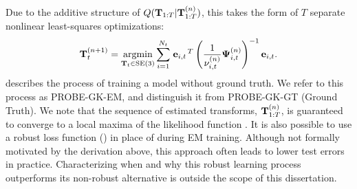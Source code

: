 Due to the additive structure of $Q(\boldsymbol{\mathbf{T}}_{1:T} \vert
\boldsymbol{\mathbf{T}}_{1:T}^{(n)})$, this takes the form of $T$ separate nonlinear least-squares optimizations:  
\begin{equation}
\label{eq:Qargmin}
  \boldsymbol{\mathbf{T}}_{t}^{(n+1)} = 
    \operatorname*{argmin}_{\boldsymbol{\mathbf{T}}_{t}\in\text{SE}(3)}
  \sum_{i=1}^{N_t} \left.{\boldsymbol{\mathbf{e}}_{i,t}}\right.^T
  \left(\frac{1}{\nu_{i,t}^{(n)}}\boldsymbol{\mathbf{\Psi}}_{i,t}^{(n)}\right)^{-1}
  \boldsymbol{\mathbf{e}}_{i,t}.
\end{equation}
  describes the process of training a model without
ground truth. We refer to this process as PROBE-GK-EM, and distinguish it from
PROBE-GK-GT (Ground Truth). We note that the sequence of estimated transforms,
$\boldsymbol{\mathbf{T}}_{1:T}^{(n)}$, is guaranteed to converge to a local maxima of the
likelihood function \citep{dempster1977maximum}. It is also possible to use a robust loss function () in place of  during EM training. Although not formally motivated by the derivation  above, this approach often leads to lower test errors in practice. Characterizing when and why this robust learning process outperforms its non-robust alternative is outside the scope of this dissertation.

